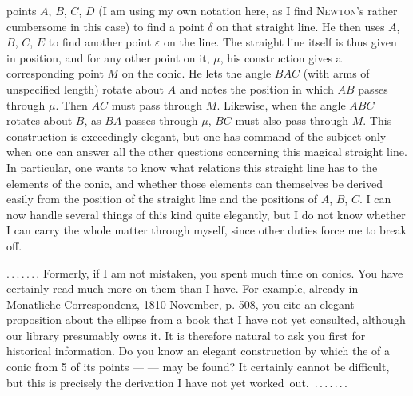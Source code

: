 %
points $A$, $B$, $C$, $D$ (I am using my own notation here, as I find \textsc{Newton}'s
rather cumbersome in this case) to find a point $\delta$ on that straight line.
He then uses $A$, $B$, $C$, $E$ to find another point $\varepsilon$ on the
line. The straight line itself is thus given in position, and for any other
point on it, $\mu$, his construction gives a corresponding
point $M$ on the conic. He lets the angle $BAC$ (with arms of unspecified length)
rotate about $A$ and notes the position in which $AB$ passes through $\mu$. Then $AC$ must
pass through $M$. Likewise, when the angle $ABC$ rotates about $B$, as
$BA$ passes through $\mu$, $BC$ must also pass through $M$. This construction is
exceedingly elegant, but one has command of the subject only when one can answer
all the other questions concerning this magical straight line.
In particular, one wants to know what relations this straight line has to the elements of the
conic, and whether those elements can themselves be derived easily from the position of the
straight line and the positions of $A$, $B$, $C$. I can now handle several things of this kind
quite elegantly, but I do not know whether I can carry the whole matter through myself,
since other duties force me to break off.

\mbox{.\,.\,.\,.\,.\,.\,.} Formerly, if I am not mistaken, you spent much time on conics.
You have certainly read much more on them than I have. For example, already in
Monatliche Correspondenz, 1810 November, p. 508, you cite an elegant proposition about the ellipse
from a book that I have not yet consulted, although our library presumably
owns it. It is therefore natural to ask you first for historical information.
Do you know an elegant construction by which the 
of a conic from 5 of its points ---  --- may be
found? It certainly cannot be difficult, but this is precisely the derivation I have not yet
\mbox{worked out. .\,.\,.\,.\,.\,.\,.}
